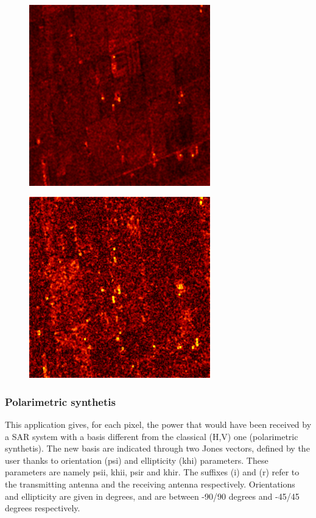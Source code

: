 \begin{figure}[!h]
\center
\includegraphics[width=0.7\textwidth]{../Art/alphahot.png}
\label{fig:alphaimage}
\end{figure}

\begin{figure}[!h]
\center
\includegraphics[width=0.7\textwidth]{../Art/anisotropyhot.png}
\label{fig:anisotropyimage}
\end{figure}

\subsubsection{Polarimetric synthetis}

This application gives, for each pixel, the power that would have been received
by a SAR system with a basis different from the classical (H,V) one
(polarimetric synthetis).  The new basis are indicated through two Jones
vectors, defined by the user thanks to orientation (psi) and ellipticity (khi)
parameters.  These parameters are namely psii, khii, psir and khir. The suffixes
(i) and (r) refer to the transmitting antenna and the receiving antenna
respectively.  Orientations and ellipticity are given in degrees, and are
between -90/90 degrees and -45/45 degrees respectively.

